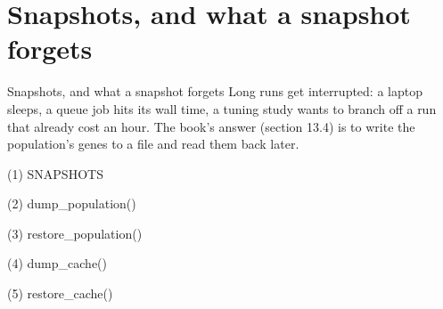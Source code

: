 
\section{Snapshots, and what a snapshot forgets}

\begin{frame}{Snapshots, and what a snapshot forgets}
Long runs get interrupted: a laptop sleeps, a queue job hits its wall time, a
tuning study wants to branch off a run that already cost an hour. The book's
answer (section 13.4) is to write the population's genes to a file and read
them back later.
\end{frame}

\begin{frame}[fragile]{(1) SNAPSHOTS}

\end{frame}

\begin{frame}[fragile]{(2) dump\_population()}

\end{frame}

\begin{frame}[fragile]{(3) restore\_population()}

\end{frame}

\begin{frame}[fragile]{(4) dump\_cache()}

\end{frame}

\begin{frame}[fragile]{(5) restore\_cache()}

\end{frame}

